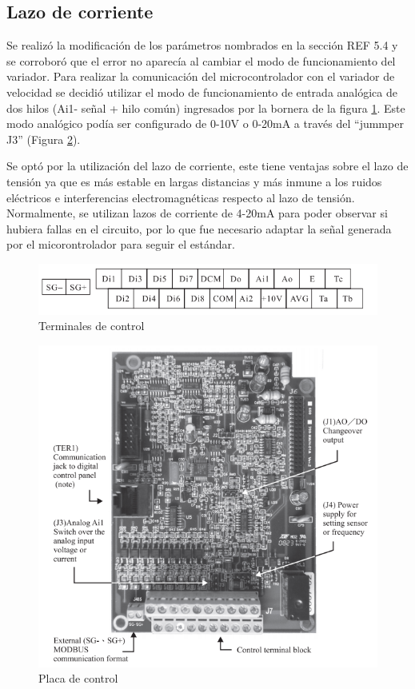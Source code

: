 \subsection{Lazo de corriente} \label{sec:lazoI}

Se realizó la modificación de los parámetros nombrados en la sección  REF 5.4 y se corroboró que el error no aparecía al cambiar el modo de funcionamiento del variador.
Para realizar la comunicación del microcontrolador con el variador de velocidad se decidió utilizar el modo de funcionamiento de entrada analógica de dos hilos (Ai1- señal + hilo común) ingresados por la bornera de la figura \ref{fig:born}. Este modo analógico podía ser configurado de 0-10V o 0-20mA a través del “jummper J3” (Figura \ref{fig:placals}).

Se optó por la utilización del lazo de corriente, este tiene ventajas sobre el lazo de tensión ya  que es más estable en largas distancias y más inmune a los ruidos eléctricos e interferencias electromagnéticas respecto al lazo de tensión. Normalmente, se utilizan lazos de corriente de 4-20mA para poder observar si hubiera fallas en el circuito, por lo que fue necesario adaptar la señal generada por el micorontrolador para seguir el estándar.



\begin{figure}[h]
	\centering
	\includegraphics[width=0.7\linewidth]{imagenes/terminales.png}
	\caption{Terminales de control}
	\label{fig:born}
\end{figure}

\begin{figure}[htbp]
	\centering
\includegraphics[width=0.7\linewidth]{imagenes/placa_ls}
\caption{Placa de control}
\label{fig:placals}
\end{figure}

